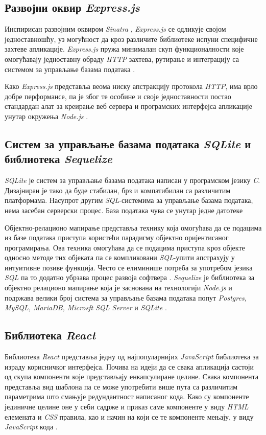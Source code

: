 \documentclass[12pt,oneside]{memoir}
\begin{document}
\subsection{Развојни оквир \textit{Express.js}}

Инспирисан развојним оквиром \textit{Sinatra} \cite{sinatra}, \textit{Express.js} се одликује својом једноставношћу, уз могућност да кроз различите библиотеке испуни специфичне захтеве апликације. \textit{Express.js} пружа минималан скуп функционалности које омогућавају једноставну обраду \textit{HTTP} захтева, рутирање и интеграцију са системом за управљање базама података \cite{express}. 

Како \textit{Express.js} представља веома ниску апстракцију протокола \textit{HTTP}, има врло добре перформансе, па је због те особине и своје једноставности постао стандардан алат за креирање веб сервера и програмских интерфејса апликације унутар окружења \textit{Node.js } \cite{mdnexpress}.

\subsection{Систем за управљање базама података \textit{SQLite} и библиотека \textit{Sequelize}}

\textit{SQLite} је систем за управљање базама података написан у програмском језику \textit{C}. Дизајниран је тако да буде стабилан, брз и компатибилан са различитим платформама.  Насупрот другим \textit{SQL}-системима за управљање базама података, нема засебан серверски процес. База података чува се унутар једне датотеке \cite{sqlite,sqlitetutorial}

Објектно-релационо мапирање представља технику која омогућава да се подацима из базе података приступа користећи парадигму објектно оријентисаног програмирања. Ова техника омогућава да се подацима приступа кроз објекте односно методе тих објеката па се компликовани \textit{SQL}-упити апстрахују у интуитивне позиве функција. Често се елиминише потреба за употребом језика \textit{SQL} па то додатно убрзава процес развоја софтвера \cite{orm}. \textit{Sequelize} је библиотека за објектно релационо мапирање која је заснована на технологији \textit{ Node.js} и подржава велики број система за управљање базама података попут \textit{Postgres, MySQL, MariaDB, Microsft SQL Server} и \textit{SQLite} \cite{sequelize}.

\subsection{Библиотека \textit{React}}
\label{section:react}
Библиотека \textit{React} представља једну од најпопуларнијих \textit{JavaScript} библиотека за израду корисничког интерфејса.  Почива на идеји да се свака апликација састоји од скупа компоненти које представљају енкапсулиране целине. Свака компонента представља вид шаблона па се може употребити више пута са различитим параметрима што смањује редундантност написаног кода. Како су компоненте јединичне целине оне у себи садрже и приказ саме компоненте у виду \textit{HTML} елемената и \textit{CSS} правила, као и начин на који се те компоненте мењају, у виду \textit{JavaScript} кода \cite{react}.
\end{document}
